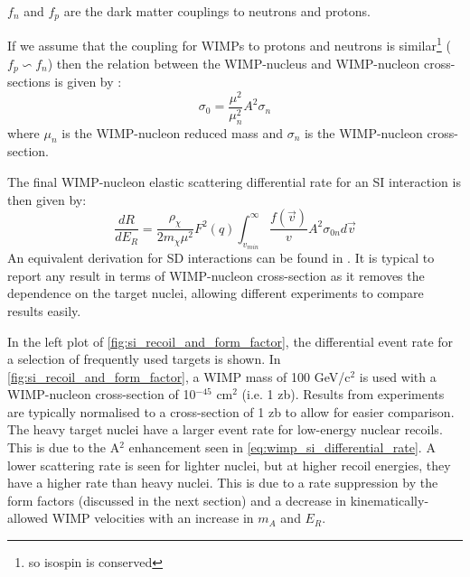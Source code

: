 $f_n$ and $f_p$ are the dark matter couplings to neutrons and protons.
\par
If we assume that the coupling for WIMPs to protons and neutrons is similar\footnote{so isospin is conserved} ($f_p \backsim f_n$) then the relation between the WIMP-nucleus and WIMP-nucleon cross-sections is given by \cite{wimp_sd_form_factor_ref}:
\begin{equation}
    \sigma_{0} = \frac{\mu^2}{\mu^2_n}A^2 \sigma_{n}
\end{equation}
where $\mu_n$ is the WIMP-nucleon reduced mass and $\sigma_n$ is the WIMP-nucleon cross-section.
\par
The final WIMP-nucleon elastic scattering differential rate for an SI interaction is then given by:
\begin{equation}
    \frac{dR}{dE_R} = \frac{\rho_\chi}{2 m_\chi \mu^2} F^2(q) \int^{\infty}_{v_{min}} \frac{f(\vec{v})}{v} A^2 \sigma_{0n} d\vec{v}
    \label{eq:wimp_si_differential_rate}
\end{equation}
An equivalent derivation for SD interactions can be found in \cite{wimp_theory_ref}.
It is typical to report any result in terms of WIMP-nucleon cross-section as it removes the dependence on the target nuclei, allowing different experiments to compare results easily.

\par
In the left plot of \autoref{fig:si_recoil_and_form_factor}, the differential event rate for a selection of frequently used targets is shown.
In \autoref{fig:si_recoil_and_form_factor}, a WIMP mass of 100 GeV/c$^2$ is used with a WIMP-nucleon cross-section of 10$^{-45}$ cm$^2$ (i.e. 1 zb).
Results from experiments are typically normalised to a cross-section of 1 zb to allow for easier comparison.
The heavy target nuclei have a larger event rate for low-energy nuclear recoils.
This is due to the A$^2$ enhancement seen in \autoref{eq:wimp_si_differential_rate}.
A lower scattering rate is seen for lighter nuclei, but at higher recoil energies, they have a higher rate than heavy nuclei.
This is due to a rate suppression by the form factors (discussed in the next section) and a decrease in kinematically-allowed WIMP velocities with an increase in $m_A$ and $E_R$.

